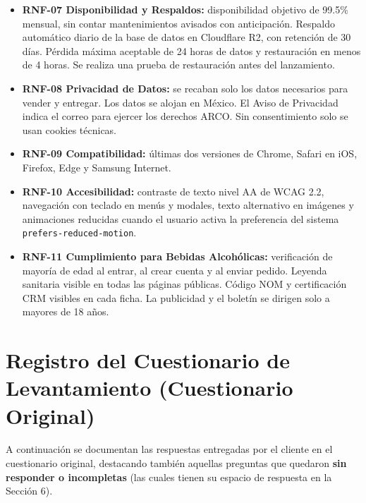 \documentclass[11pt,letterpaper]{article}
\begin{document}
\begin{itemize}[leftmargin=1.5em]
    \item \textbf{RNF-07 Disponibilidad y Respaldos:} disponibilidad objetivo de 99.5\% mensual, sin contar mantenimientos avisados con anticipación. Respaldo automático diario de la base de datos en Cloudflare R2, con retención de 30 días. Pérdida máxima aceptable de 24 horas de datos y restauración en menos de 4 horas. Se realiza una prueba de restauración antes del lanzamiento.
    \item \textbf{RNF-08 Privacidad de Datos:} se recaban solo los datos necesarios para vender y entregar. Los datos se alojan en México. El Aviso de Privacidad indica el correo para ejercer los derechos ARCO. Sin consentimiento solo se usan cookies técnicas.
    \item \textbf{RNF-09 Compatibilidad:} últimas dos versiones de Chrome, Safari en iOS, Firefox, Edge y Samsung Internet.
    \item \textbf{RNF-10 Accesibilidad:} contraste de texto nivel AA de WCAG 2.2, navegación con teclado en menús y modales, texto alternativo en imágenes y animaciones reducidas cuando el usuario activa la preferencia del sistema \texttt{prefers-reduced-motion}.
    \item \textbf{RNF-11 Cumplimiento para Bebidas Alcohólicas:} verificación de mayoría de edad al entrar, al crear cuenta y al enviar pedido. Leyenda sanitaria visible en todas las páginas públicas. Código NOM y certificación CRM visibles en cada ficha. La publicidad y el boletín se dirigen solo a mayores de 18 años.
\end{itemize}

\newpage

\section{Registro del Cuestionario de Levantamiento (Cuestionario Original)}

A continuación se documentan las respuestas entregadas por el cliente en el cuestionario original, destacando también aquellas preguntas que quedaron \textbf{sin responder o incompletas} (las cuales tienen su espacio de respuesta en la Sección 6).
\end{document}
